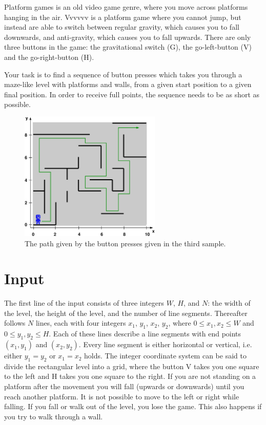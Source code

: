 Platform games is an old video game genre, where you move across platforms hanging in the air. Vvvvvv is a platform game where you cannot jump, but instead are able to switch between regular gravity, which causes you to fall downwards, and anti-gravity, which causes you to fall upwards. There are only three buttons in the game: the gravitational switch (G), the go-left-button (V) and the go-right-button (H).

Your task is to find a sequence of button presses which takes you through a maze-like level with platforms and walls, from a given start position to a given final position. In order to receive full points, the sequence needs to be as short as possible.

\begin{figure}[ht!]
\centering
\includegraphics[width=0.6\textwidth]{spelplan.pdf}
\caption{The path given by the button presses given in the third sample.}
\label{overflow}
\end{figure}

\section*{Input}
The first line of the input consists of three integers $W$, $H$, and $N$: the width of the level, the height of the level, and the number of line segments. Thereafter follows $N$ lines, each with four integers $x_1$, $y_1$, $x_2$, $y_2$, where $0 \le x_1, x_2 \le W$ and $0 \le y_1, y_2 \le H$. Each of these lines describe a line segments with end points $(x_1, y_1)$ and $(x_2, y_2)$. Every line segment is either horizontal or vertical, i.e. either $y_1=y_2$ or $x_1=x_2$ holds. The integer coordinate system can be said to divide the rectangular level into a grid, where the button V takes you one square to the left and H takes you one square to the right. If you are not standing on a platform after the movement you will fall (upwards or downwards) until you reach another platform. It is not possible to move to the left or right while falling. If you fall or walk out of the level, you lose the game. This also happens if you try to walk through a wall.

